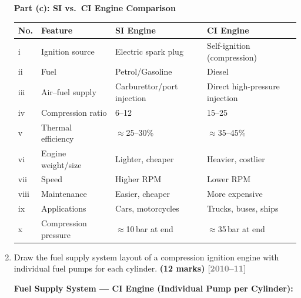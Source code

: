 \documentclass[12pt,a3paper]{article}
\newcommand{\yr}[1]{\hfill\textcolor{gray}{\small\textbf{[#1]}}}
\newcommand{\mk}[1]{\textcolor{orange!70!black}{\small\textbf{(#1 marks)}}}
\begin{document}
\begin{enumerate}
\begin{tcolorbox}[enhanced,breakable,ansbox,colback=cB!4,colframe=cB,
  boxrule=0.8pt,arc=5pt,
  title={\textbf{Answer}},fonttitle=\bfseries\color{white},colbacktitle=cB]
\hrulefill

\textbf{Part (c): SI vs.\ CI Engine Comparison}

\begin{center}
\small
\begin{tabular}{@{}llll@{}}
\toprule
\textbf{No.} & \textbf{Feature}        & \textbf{SI Engine}         & \textbf{CI Engine} \\
\midrule
i   & Ignition source          & Electric spark plug         & Self-ignition (compression) \\
ii  & Fuel                     & Petrol/Gasoline             & Diesel \\
iii & Air--fuel supply         & Carburettor/port injection  & Direct high-pressure injection \\
iv  & Compression ratio        & 6--12                       & 15--25 \\
v   & Thermal efficiency       & $\approx$25--30\%           & $\approx$35--45\% \\
vi  & Engine weight/size       & Lighter, cheaper            & Heavier, costlier \\
vii & Speed                    & Higher RPM                  & Lower RPM \\
viii& Maintenance              & Easier, cheaper             & More expensive \\
ix  & Applications             & Cars, motorcycles           & Trucks, buses, ships \\
x   & Compression pressure     & $\approx$10\,bar at end     & $\approx$35\,bar at end \\
\bottomrule
\end{tabular}
\end{center}

\end{tcolorbox}

\item \label{qlabel:A2-Q16}
Draw the fuel supply system layout of a compression ignition engine with individual fuel pumps for each cylinder. \mk{12}
\yr{2010--11}

\begin{tcolorbox}[enhanced,breakable,ansbox,colback=cB!4,colframe=cB,
  boxrule=0.8pt,arc=5pt,
  title={\textbf{Answer}},fonttitle=\bfseries\color{white},colbacktitle=cB]

\textbf{Fuel Supply System — CI Engine (Individual Pump per Cylinder):}


\end{tcolorbox}
\end{enumerate}
\end{document}
